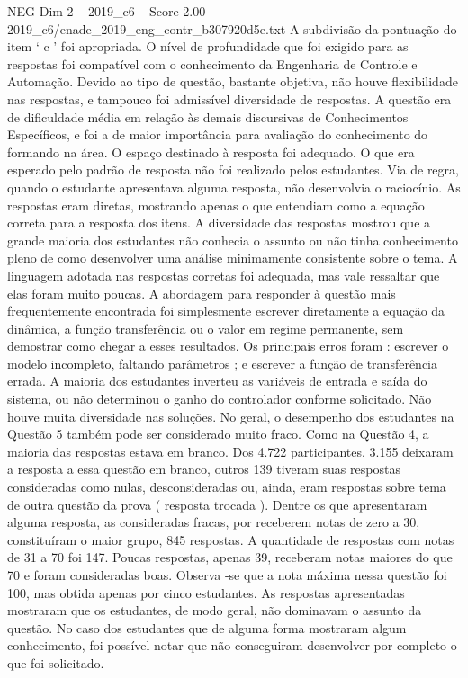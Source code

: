 \begin{textsample}{NEG Dim 2 – 2019\_c6 – Score 2.00 – 2019\_c6/enade\_2019\_eng\_contr\_b307920d5e.txt}
A subdivisão da pontuação do item ‘ c ’ foi apropriada.
O nível de profundidade que foi exigido para as respostas foi compatível com o conhecimento da Engenharia de Controle e Automação.
Devido ao tipo de questão, bastante objetiva, não houve flexibilidade nas respostas, e tampouco foi admissível diversidade de respostas.
A questão era de dificuldade média em relação às demais discursivas de Conhecimentos Específicos, e foi a de maior importância para avaliação do conhecimento do formando na área.
O espaço destinado à resposta foi adequado.
O que era esperado pelo padrão de resposta não foi realizado pelos estudantes.
Via de regra, quando o estudante apresentava alguma resposta, não desenvolvia o raciocínio.
As respostas eram diretas, mostrando apenas o que entendiam como a equação correta para a resposta dos itens.
A diversidade das respostas mostrou que a grande maioria dos estudantes não conhecia o assunto ou não tinha conhecimento pleno de como desenvolver uma análise minimamente consistente sobre o tema.
A linguagem adotada nas respostas corretas foi adequada, mas vale ressaltar que elas foram muito poucas.
A abordagem para responder à questão mais frequentemente encontrada foi simplesmente escrever diretamente a equação da dinâmica, a função transferência ou o valor em regime permanente, sem demostrar como chegar a esses resultados.
Os principais erros foram : escrever o modelo incompleto, faltando parâmetros ; e escrever a função de transferência errada.
A maioria dos estudantes inverteu as variáveis de entrada e saída do sistema, ou não determinou o ganho do controlador conforme solicitado.
Não houve muita diversidade nas soluções.
No geral, o desempenho dos estudantes na Questão 5 também pode ser considerado muito fraco.
Como na Questão 4, a maioria das respostas estava em branco.
Dos 4.722 participantes, 3.155 deixaram a resposta a essa questão em branco, outros 139 tiveram suas respostas consideradas como nulas, desconsideradas ou, ainda, eram respostas sobre tema de outra questão da prova ( resposta trocada ).
Dentre os que apresentaram alguma resposta, as consideradas fracas, por receberem notas de zero a 30, constituíram o maior grupo, 845 respostas.
A quantidade de respostas com notas de 31 a 70 foi 147.
Poucas respostas, apenas 39, receberam notas maiores do que 70 e foram consideradas boas.
Observa -se que a nota máxima nessa questão foi 100, mas obtida apenas por cinco estudantes.
As respostas apresentadas mostraram que os estudantes, de modo geral, não dominavam o assunto da questão.
No caso dos estudantes que de alguma forma mostraram algum conhecimento, foi possível notar que não conseguiram desenvolver por completo o que foi solicitado.

\end{textsample}

